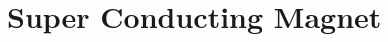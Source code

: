\documentclass[11pt,twoside,notitlepage]{book}
\begin{document}
\frontmatter

\pagestyle{fancy}

\mainmatter

\setcounter{chapter}{0}
\setcounter{page}{1}

\chapter{Super Conducting Magnet}





\end{document}
